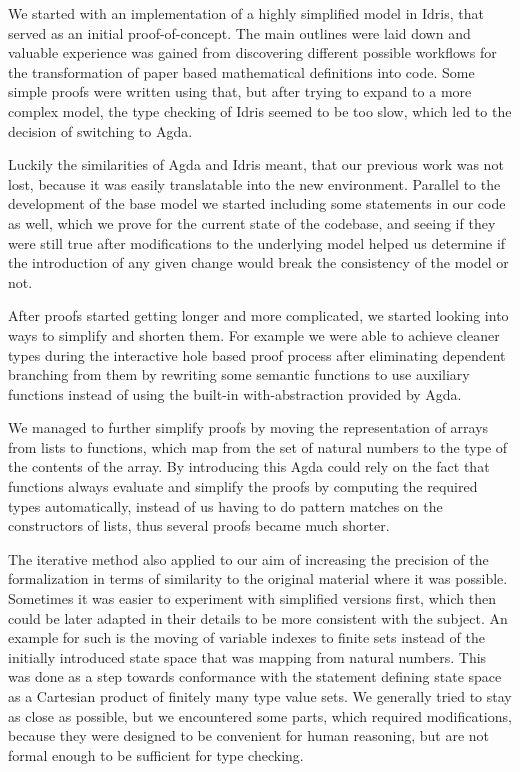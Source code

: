 We started with an implementation of a highly simplified model in Idris, that served as an initial proof-of-concept. The main outlines were laid down and valuable experience was gained from discovering different possible workflows for the transformation of paper based mathematical definitions into code. Some simple proofs were written using that, but after trying to expand to a more complex model, the type checking of Idris seemed to be too slow, which led to the decision of switching to Agda.

Luckily the similarities of Agda and Idris meant, that our previous work was not lost, because it was easily translatable into the new environment. Parallel to the development of the base model we started including some statements in our code as well, which we prove for the current state of the codebase, and seeing if they were still true after modifications to the underlying model helped us determine if the introduction of any given change would break the consistency of the model or not.

After proofs started getting longer and more complicated, we started looking into ways to simplify and shorten them. For example we were able to achieve cleaner types during the interactive hole based proof process after eliminating dependent branching from them by rewriting some semantic functions to use auxiliary functions instead of using the built-in with-abstraction provided by Agda.

We managed to further simplify proofs by moving the representation of arrays from lists to functions, which map from the set of natural numbers to the type of the contents of the array. By introducing this Agda could rely on the fact that functions always evaluate and simplify the proofs by computing the required types automatically, instead of us having to do pattern matches on the constructors of lists, thus several proofs became much shorter.

The iterative method also applied to our aim of increasing the precision of the formalization in terms of similarity to the original material where it was possible. Sometimes it was easier to experiment with simplified versions first, which then could be later adapted in their details to be more consistent with the subject. An example for such is the moving of variable indexes to finite sets instead of the initially introduced state space that was mapping from natural numbers. This was done as a step towards conformance with the statement defining state space as a Cartesian product of finitely many type value sets. We generally tried to stay as close as possible, but we encountered some parts, which required modifications, because they were designed to be convenient for human reasoning, but are not formal enough to be sufficient for type checking.

